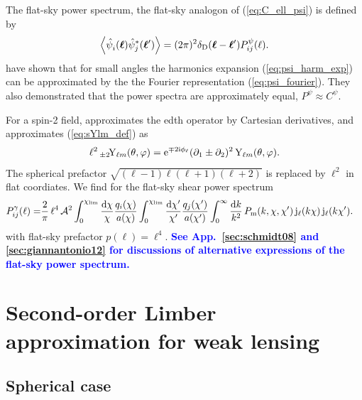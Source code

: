 \documentclass[fleqn,usenatbib]{mnras} %
\newcommand{\pref}{{\cal A}}
\renewcommand{\vec}{\bm}
\newcommand{\mk}[1]{{\bf\textcolor{blue}{#1}}}
\begin{document}
The flat-sky power spectrum, the flat-sky analogon of (\ref{eq:C_ell_psi}) is defined by
%
\begin{equation}
  \left\langle \hat \psi_i^{}(\vec \ell) \hat \psi_j^\ast(\vec \ell^\prime) \right\rangle
    = (2\pi)^2 \delta_{\rm D}(\vec \ell - \vec \ell^\prime) P^\psi_{ij}(\ell).
  \label{eq:P_ell_psi}
\end{equation}
%
\cite{2000PhRvD..62d3007H} have shown that for small angles the harmonics
expansion (\ref{eq:psi_harm_exp}) can be approximated by the the Fourier
representation (\ref{eq:psi_fourier}). They also demonstrated that the power
spectra are approximately equal, $P^\psi \approx C^\psi$.

For a spin-2 field, \cite{2000PhRvD..62d3007H} approximates the edth operator by Cartesian derivatives, and approximates
(\ref{eq:sYlm_def}) as
%
\begin{equation}
  \ell^2 \, _{\pm2}\!{\rm Y}_{\ell m}(\theta, \varphi) =  {\rm e}^{{\mp}2 {\rm i} \phi_\ell}
    (\partial_1 \pm \partial_2)^2 \, {\rm Y}_{\ell m}(\theta, \varphi).
  \label{eq:sYlm_def_flat}
\end{equation}
%
The spherical prefactor $\sqrt{(\ell-1) \ell (\ell+1) (\ell+2)}$ is replaced by $\ell^2$ in flat coordiates.
We find for the flat-sky shear power spectrum
%
\begin{align}
  P^\gamma_{ij}(\ell) 
                 = & \frac 2 \pi \, \ell^4 \, \pref^2
                 \int_{0}^{\chi_{\rm lim}} \frac{\rm d \chi}{\chi} \frac{q_i(\chi)}{a(\chi)}
                \int_{0}^{\chi_{\rm lim}} \frac{\rm d \chi^\prime}{\chi^\prime}
                \frac{q_j(\chi^\prime)}{a(\chi^\prime)}
                \int_0^\infty \frac{{\rm d} k}{k^2} \, P_{\rm m}(k, \chi, \chi^\prime) \,
                {\rm j}_\ell(k \chi) \, {\rm j}_\ell(k \chi^\prime) .
  \label{eq:P_ell_gamma_full_der}
\end{align}
%
with flat-sky prefactor $p(\ell) = \ell^4$.
\mk{See App.~\ref{sec:schmidt08} and \ref{sec:giannantonio12} for discussions of alternative expressions of the flat-sky power spectrum.}


\section{Second-order Limber approximation for weak lensing}
\label{sec:L2}

\subsection{Spherical case}
\end{document}
